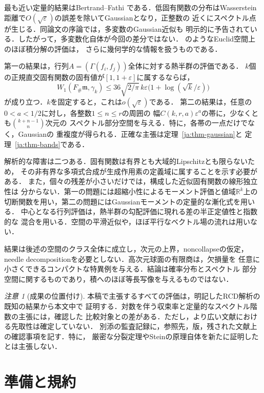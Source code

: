 \documentclass[12pt]{amsart}
\theoremstyle{definition}
\theoremstyle{remark}
\numberwithin{equation}{section}
\newcommand{\R}{\mathbb{R}}
\newcommand{\m}{\mathfrak m}
\theoremstyle{jpplain}
\newtheorem{jrem}[thm]{注意}
\begin{document}
最も近い定量的結果はBertrand--Fathi
\cite[Theorems 1.2 and 1.3]{ja:BF}である．低固有関数の分布はWasserstein
距離で$O(\sqrt\varepsilon)$の誤差を除いてGaussianとなり，正整数の
近くにスペクトル点が生じる．同論文の序論では，多変数のGaussian近似も
明示的に予告されている．したがって，多変数化自体が今回の差分ではない．
\cite[Theorem 1.2]{ja:CF}のようなEuclid空間上のほぼ積分解の評価は，
さらに幾何学的な情報を扱うものである．

第一の結果は，行列$A=(\Gamma(f_i,f_j))$全体に対する熱半群の評価である．
$k$個の正規直交固有関数の固有値が$[1,1+\varepsilon]$に属するならば，
\[
 W_1(F_\#\m,\gamma_k)
 \leq36\sqrt{2/\pi}\,k\varepsilon
       \bigl(1+\log(\sqrt{k}/\varepsilon)\bigr)
\]
が成り立つ．$k$を固定すると，これは$o(\sqrt\varepsilon)$である．
第二の結果は，任意の$0<a<1/2$に対し，各整数$1\leq n\leq r$の周囲の
幅$C(k,r,a)\varepsilon^a$の帯に，少なくとも$\binom{k+n-1}{n}$次元の
スペクトル部分空間を与える．特に，各帯の一点だけでなく，Gaussianの
重複度が得られる．正確な主張は定理~\ref{ja:thm-gaussian}と
定理~\ref{ja:thm-bands}である．

解析的な障害は二つある．固有関数は有界とも大域的Lipschitzとも限らないため，
その非有界な多項式合成が生成作用素の定義域に属することを示す必要がある．
また，個々の残差が小さいだけでは，構成した近似固有関数の線形独立性は
分からない．第一の問題には超縮小性によるモーメント評価と値域$\R^k$上の
切断関数を用い，第二の問題にはGaussianモーメントの定量的な漸化式を用いる．
中心となる行列評価は，熱半群の勾配評価に現れる差の半正定値性と指数的な
混合を用いる．空間の平滑近似や，ほぼ平行なベクトル場の流れは用いない．

結果は後述の空間のクラス全体に成立し，次元の上界，noncollapseの仮定，
needle decompositionを必要としない．高次元球面の有限商は，欠損量を
任意に小さくできるコンパクトな特異例を与える．結論は確率分布とスペクトル
部分空間に関するものであり，積へのほぼ等長写像を与えるものではない．

\begin{jrem}[成果の位置付け]
本稿で主張するすべての評価は，明記したRCD解析の既知の結果から本文中で
証明する．対数を伴う収束率と定量的なスペクトル階数の主張には，確認した
比較対象との差がある．ただし，より広い文献における先取性は確定していない．
別添の監査記録に，参照先，版，残された文献上の確認事項を記す．特に，
厳密な分裂定理やSteinの原理自体を新たに証明したとは主張しない．
\end{jrem}

\section{準備と規約}
\end{document}
